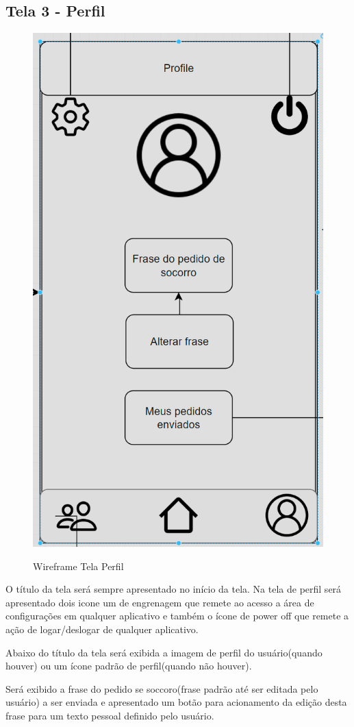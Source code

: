\subsection{Tela 3 - Perfil}
\begin{figure}[h]
  \begin{center}
  \includegraphics[width=0.2\linewidth]{images/wire-tela-perfil.png}\\
  \end{center}
  \caption[Wireframe Tela Perfil]{Wireframe Tela Perfil}
  \label{fig:wireframe-tela-perfil}
\end{figure}
\pagebreak
O título da tela será sempre apresentado no início da tela.  Na tela de perfil será apresentado dois icone um de engrenagem que remete ao acesso a área de configurações em qualquer aplicativo e também o ícone de power off que remete a ação de logar/deslogar de qualquer aplicativo. 

Abaixo do título da tela será exibida a imagem de perfil do usuário(quando houver) ou um ícone padrão de perfil(quando não houver).

Será exibido a frase do pedido se soccoro(frase padrão até ser editada pelo usuário) a ser enviada e apresentado um botão para acionamento da edição desta frase para um texto pessoal definido pelo usuário. 


